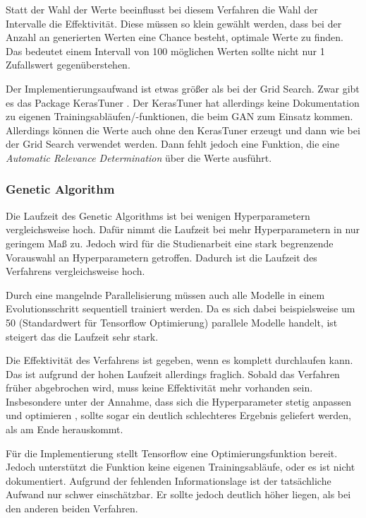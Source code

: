 Statt der Wahl der Werte beeinflusst bei diesem Verfahren die Wahl der Intervalle die Effektivität.
Diese müssen so klein gewählt werden, dass bei der Anzahl an generierten Werten eine Chance besteht, optimale Werte zu finden.
Das bedeutet einem Intervall von 100 möglichen Werten sollte nicht nur 1 Zufallswert gegenüberstehen. 
\newline

Der Implementierungsaufwand ist etwas größer als bei der Grid Search.
Zwar gibt es das Package KerasTuner \cite{omalley2019kerastuner}.
Der KerasTuner hat allerdings keine Dokumentation zu eigenen Trainingsabläufen/-funktionen, die beim GAN zum Einsatz kommen.
Allerdings können die Werte auch ohne den KerasTuner erzeugt und dann wie bei der Grid Search verwendet werden.
Dann fehlt jedoch eine Funktion, die eine \textit{Automatic Relevance Determination} über die Werte ausführt.

\subsubsection{Genetic Algorithm}
Die Laufzeit des Genetic Algorithms ist bei wenigen Hyperparametern vergleichsweise hoch.
Dafür nimmt die Laufzeit bei mehr Hyperparametern in nur geringem Maß zu.
Jedoch wird für die Studienarbeit eine stark begrenzende Vorauswahl an Hyperparametern getroffen. 
Dadurch ist die Laufzeit des Verfahrens vergleichsweise hoch.

Durch eine mangelnde Parallelisierung müssen auch alle Modelle in einem Evolutionsschritt sequentiell trainiert werden.
Da es sich dabei beispielsweise um 50 (Standardwert für Tensorflow Optimierung) parallele Modelle handelt, ist steigert das die Laufzeit sehr stark.
\newline

Die Effektivität des Verfahrens ist gegeben, wenn es komplett durchlaufen kann.
Das ist aufgrund der hohen Laufzeit allerdings fraglich.
Sobald das Verfahren früher abgebrochen wird, muss keine Effektivität mehr vorhanden sein.
Insbesondere unter der Annahme, dass sich die Hyperparameter stetig anpassen und optimieren , sollte sogar ein deutlich schlechteres Ergebnis geliefert werden, als am Ende herauskommt.
\newline

Für die Implementierung stellt Tensorflow eine Optimierungsfunktion bereit.
Jedoch unterstützt die Funktion keine eigenen Trainingsabläufe, oder es ist nicht dokumentiert.
Aufgrund der fehlenden Informationslage ist der tatsächliche Aufwand nur schwer einschätzbar. %
Er sollte jedoch deutlich höher liegen, als bei den anderen beiden Verfahren.

